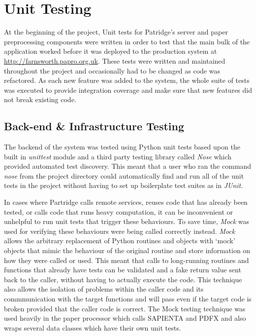 %  
%

\section{ Unit Testing }

At the beginning of the project, Unit tests for Patridge's server and paper
preprocessing components were written in order to test that the main bulk of
the application worked before it was deployed to the production system at
\url{http://farnsworth.papro.org.uk}. These tests were written and maintained
throughout the project and occasionally had to be changed as code was
refactored. As each new feature was added to the system, the whole suite of
tests was executed to provide integration coverage and make sure that new
features did not break existing code. 

\subsection{ Back-end \& Infrastructure Testing}

The backend of the system was tested using Python unit tests based upon the
built in \emph{unittest} module and a third party testing library called
\emph{Nose} which provided automated test discovery. This meant that a user who
ran the command \emph{nose} from the project directory could automatically find
and run all of the unit tests in the project without having to set up
boilerplate test suites as in \emph{JUnit}.

In cases where Partridge calls remote services, reuses code that has already
been tested, or calls code that runs heavy computation, it can be inconvenient
or unhelpful to run unit tests that trigger these behaviours. To save time,
\emph{Mock}\cite{mock2013} was used for verifying these behaviours were being
called correctly instead.  \emph{Mock} allows the arbitrary replacement of
Python routines and objects with `mock' objects that mimic the behaviour of the
original routine and store information on how they were called or used. This
meant that calls to long-running routines and functions that already have tests
can be validated and a fake return value sent back to the caller, without
having to actually execute the code. This technique also allows the isolation
of problems within the caller code and its commmunication with the target
functions and will pass even if the target code is broken provided that the
caller code is correct\cite{saff2004mock}. The Mock testing technique was used
heavily in the paper processor which calls SAPIENTA and PDFX and also wraps
several data classes which have their own unit tests.

